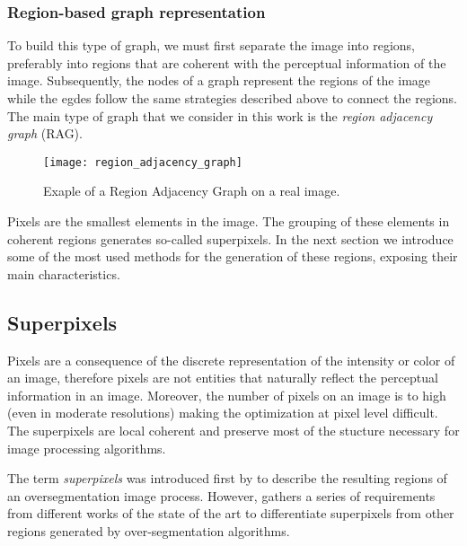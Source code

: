 \subsubsection{Region-based graph representation}

To build this type of graph, we must first separate the image into regions, preferably into regions that are coherent with the perceptual information of the image. Subsequently, the nodes of a graph represent the regions of the image while the egdes follow the same strategies described above to connect the regions. The main type of graph that we consider in this work is the \textit{region adjacency graph }(RAG).


\begin{figure}[!ht]
	\centering
	\texttt{[image: region\_adjacency\_graph]}       	    
    \caption{Exaple of a Region Adjacency Graph on a real image.}
    \label{fig:region_adjacency_graph}    
\end{figure}


Pixels are the smallest elements in the image. The grouping of these elements in coherent regions generates so-called superpixels. In the next section we introduce some of the most used methods for the generation of these regions, exposing their main characteristics.


\subsection{Superpixels}

Pixels are a consequence of the discrete representation of the intensity or color of an image, therefore pixels are not entities that naturally reflect the perceptual information in an image. Moreover, the number of pixels on an image is to high (even in moderate resolutions) making the optimization at pixel level difficult. The superpixels are local coherent and preserve most of the stucture necessary for image processing algorithms.

The term \textit{superpixels} was introduced first by \cite{Ren.Malik:ICCV:2003} to describe the resulting regions of an oversegmentation image process. However, \cite{Stutz.Hermans.ea:CVIU:2018} gathers a series of requirements from different works of the state of the art to differentiate superpixels from other regions generated by over-segmentation algorithms. 

